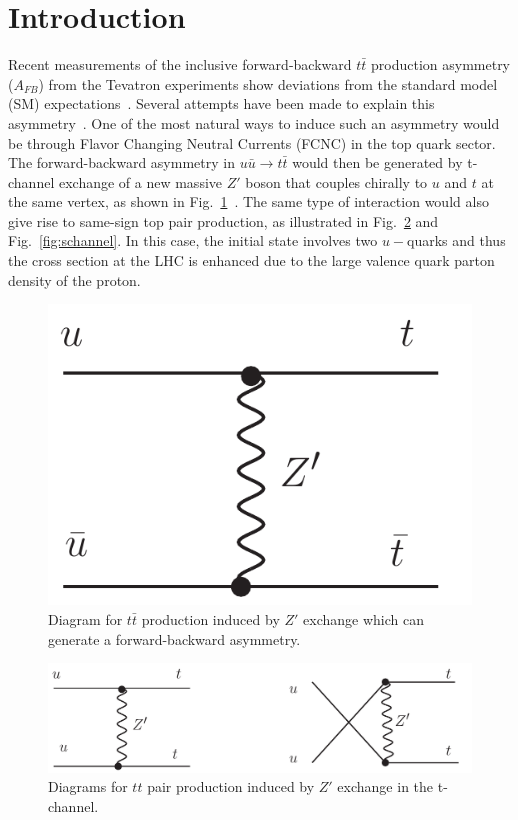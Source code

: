 \section{Introduction}
\label{sec:intro}

Recent measurements of the inclusive forward-backward $t\bar{t}$ production 
asymmetry ($A_{FB}$) from the 
Tevatron experiments show deviations from the standard model 
(SM) expectations~\cite{d0:fwtop, cdf:fwtop1, cdf:fwtop2}.
Several attempts have been made to explain this asymmetry~\cite{berger, Buckley, Gresham, zoltan}. 
One of the most natural ways to induce such an asymmetry would be through
Flavor Changing Neutral Currents (FCNC) in the top quark sector. 
The forward-backward asymmetry in $u\bar{u} \to t\bar{t}$ would then be generated
by t-channel exchange of a new massive $Z'$ boson that couples chirally to
$u$ and $t$ at the same vertex, as shown in Fig.~\ref{fig:ttbar}~\cite{berger}.
The same type of interaction would also give rise to same-sign top pair production, 
as illustrated in Fig.~\ref{fig:tchannel} and Fig.~\ref{fig:schannel}. 
In this case, the initial state involves two $u-$quarks and 
thus the cross section at the LHC is enhanced due 
to the large valence quark parton density of the proton. 

\begin{figure}[htb]
\begin{center}
\includegraphics[width=0.35\linewidth, height=0.25\linewidth]{figs/ttbar_Z.pdf}
\caption{ Diagram for $t\bar{t}$ production induced by $Z'$ exchange which
can generate a forward-backward asymmetry. \label{fig:ttbar}}
\end{center}
\end{figure}

\begin{figure}[htb]
\begin{center}
\includegraphics[width=0.7\linewidth, height=0.2\linewidth]{figs/sstop1.pdf}
\caption{ Diagrams for $tt$ pair production induced by $Z'$ exchange in the t-channel. 
\label{fig:tchannel}}
\end{center}
\end{figure}

